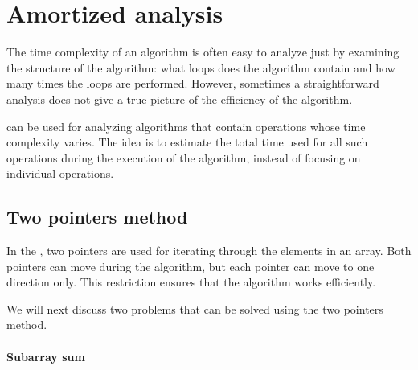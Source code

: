 \chapter{Amortized analysis}


The time complexity of an algorithm
is often easy to analyze
just by examining the structure
of the algorithm:
what loops does the algorithm contain
and how many times the loops are performed.
However, sometimes a straightforward analysis
does not give a true picture of the efficiency of the algorithm.

 can be used for analyzing
algorithms that contain operations whose
time complexity varies.
The idea is to estimate the total time used for
all such operations during the
execution of the algorithm, instead of focusing
on individual operations.

\section{Two pointers method}


In the ,
two pointers are used for
iterating through the elements in an array.
Both pointers can move during the algorithm,
but each pointer can move to one direction only.
This restriction ensures that the algorithm works efficiently.

We will next discuss two problems that can be solved
using the two pointers method.

\subsubsection{Subarray sum}

